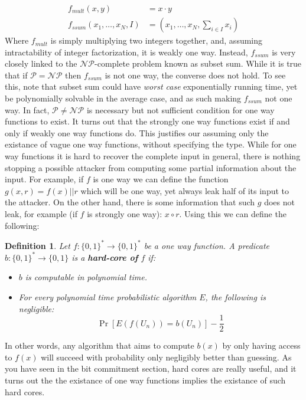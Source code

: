 \documentclass{article}
\newtheorem{definition}{Definition}
\begin{document}
\begin{align*}
    f_{mult}(x,y) &=  x \cdot y \\
    f_{ssum}(x_1, \dots, x_N, I) &= (x_1, \dots, x_N, \sum_{i \in I} x_i)
\end{align*}
Where $f_{mult}$ is simply multiplying two integers together, and, assuming intractability of integer factorization, it is weakly one way.
Instead, $f_{ssum}$ is very closely linked to the $\mathcal{NP}$-complete problem known as subset sum. 
While it is true that if $\mathcal{P} = \mathcal{NP}$ then $f_{ssum}$ is not one way, the converse does not hold. To see this, note that subset sum could have \textit{worst case} exponentially running time, yet be polynomially solvable in the average case, and as such making $f_{ssum}$ not one way.
In fact, $\mathcal{P} \neq \mathcal{NP}$ is necessary but not sufficient condition for one way functions to exist.
It turns out \cite{goldreichFoundationsCryptographyVol2007} that the strongly one way functions exist if and only if weakly one way functions do. This justifies our assuming only the existance of vague one way functions, without specifying the type.
While for one way functions it is hard to recover the complete input in general, there is nothing stopping a possible attacker from computing some partial information about the input.
For example, if $f$ is one way we can define the function $g(x, r) = f(x) || r$ which will be one way, yet always leak half of its input to the attacker.
On the other hand, there is some information that such $g$ does not leak, for example (if $f$ is strongly one way): $x \circ r$. 
Using this we can define the following:
\begin{definition}
    Let $f: \{0, 1\}^* \to \{0, 1\}^*$ be a one way function. A predicate $b: \{0,1\}^* \to \{0, 1\}$ is 
    a \textbf{hard-core of} $f$ if:
    \begin{itemize}
        \item $b$ is computable in polynomial time.
        \item For every polynomial time probabilistic algorithm $E$, the following is negligible:
        \[ \Pr[E(f(U_n)) = b(U_n)] - \frac{1}{2} \]
    \end{itemize}
\end{definition}
In other words, any algorithm that aims to compute $b(x)$ by only having access to $f(x)$ will succeed with probability
only negligibly better than guessing. As you have seen in the bit commitment section, hard cores are really useful, and it turns out \cite{goldreichFoundationsCryptographyVol2007} the the existance of one way functions implies the existance of such hard cores. 
\end{document}
